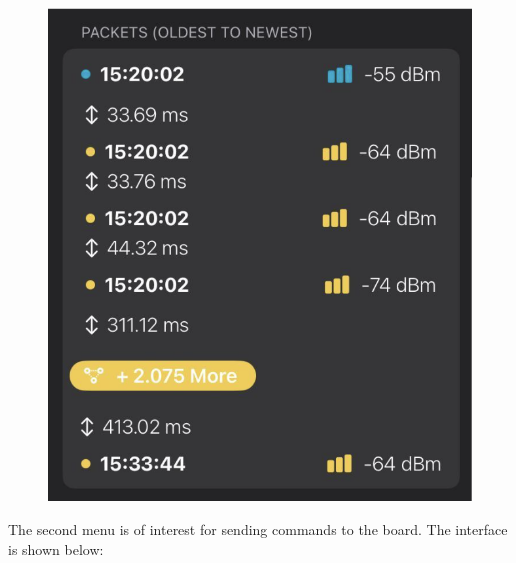 \documentclass{Configuration_Files/PoliMi3i_thesis}
\begin{document}
\begin{figure}[H]
    \centering
    \includegraphics[scale=0.3]{Multicentral/10.png}
    \label{fig:multicentral_implementation}
\end{figure}

The second menu is of interest for sending commands to the board. The interface is shown below:
\end{document}

